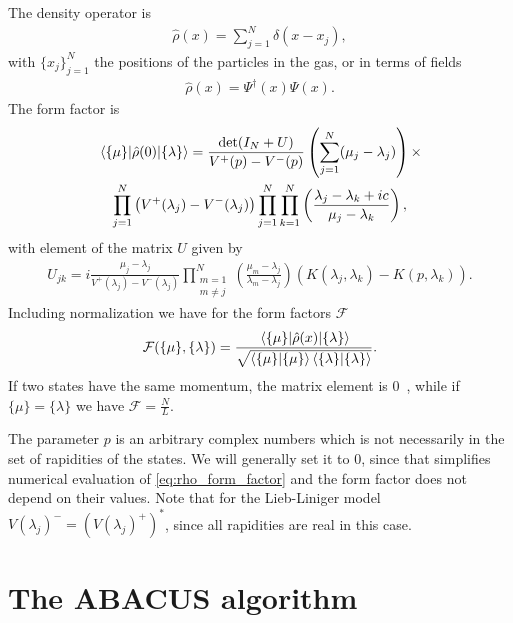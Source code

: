 \documentclass[11pt, a4paper]{report} %
\begin{document}
The density operator is~\cite{Nardis2015}
\begin{align}
  \hat{\rho}(x) = \sum_{j=1}^N \delta(x-x_j),
\end{align}
with \(\{x_j\}_{j=1}^N\) the positions of the particles in the gas, or in terms of fields~\cite{slavnov90_noneq_time_curren_correl_funct}
\begin{align}
  \label{eq:44}
  \hat{\rho}(x) = \Psi^{\dag}(x)\Psi(x).
\end{align}
The form factor is~\cite{slavnov90_noneq_time_curren_correl_funct, Nardis2015}
\begin{multline}
  \label{eq:rho_form_factor}
  \matrixel{\{\mu\}}{\hat{\rho}(0)}{\{\lambda\}} = \frac{\det(I_N +U)}{V^+(p) - V^-(p)}
  \left(\sum_{j=1}^N(\mu_j-\lambda_j)\right) \times\\ \prod_{j=1}^N\left(V^+(\lambda_j) - V^-(\lambda_j)\right)\prod_{j=1}^N\prod_{k=1}^N\left(\frac{\lambda_j-\lambda_k+ic}{\mu_j-\lambda_k}\right),
\end{multline}
with element of the matrix \(U\) given by
\begin{align}
  U_{jk} = i \frac{\mu_j-\lambda_j}{V^+(\lambda_j) -V^-(\lambda_j)}\prod_{\substack{m=1\\m\neq j}}^N \left(\frac{\mu_m - \lambda_j}{\lambda_m-\lambda_j}\right) \left(K(\lambda_j, \lambda_k) - K(p, \lambda_k)\right).
\end{align}
Including normalization we have for the form factors \(\mathcal{F}\)~\cite{Nardis2015}
\begin{align}
  \label{eq:21}
  \mathcal{F}(\{\mu\}, \{\lambda\}) = \frac{\matrixel{\{\mu\}}{\hat{\rho}(x)}{\{\lambda\}}}{\sqrt{\innerproduct{\{\mu\}}{\{\mu\}}\innerproduct{\{\lambda\}}{\{\lambda\}}}}.
\end{align}
If two states have the same momentum, the matrix element is 0~\cite{slavnov90_noneq_time_curren_correl_funct}, while if $\{\mu\} = \{\lambda\}$ we have $\mathcal{F}=\frac{N}{L}$.

The parameter \(p\) is an arbitrary complex numbers which is not necessarily in the set of rapidities of the states.
We will generally set it to 0, since that simplifies numerical evaluation of \cref{eq:rho_form_factor} and the form factor does not depend on their values.
Note that for the Lieb-Liniger model \(V(\lambda_j)^{-} = (V(\lambda_j)^{+})^{*}\), since all rapidities are real in this case.

\chapter{The ABACUS algorithm}\label{chap:abacus}
\end{document}
